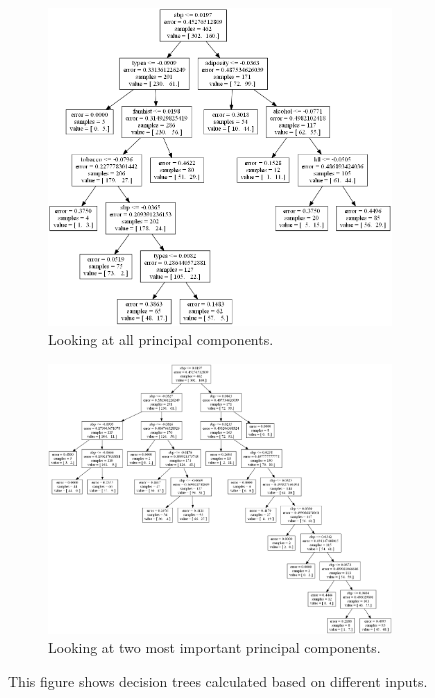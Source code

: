\begin{figure}
	\begin{subfigure}[b]{0.5\textwidth}
	\includegraphics[scale=0.2]{pictures/Decision_Tree_XPC.png}
	\caption{Looking at all principal components.}
	\label{decisionTreeXPA}
	\end{subfigure}
	\begin{subfigure}[b]{0.5\textwidth}
	\includegraphics[scale=0.2]{pictures/Decision_Tree_X2PC.png}
	\caption{Looking at two most important principal components.}
	\label{decisionTreeX2PA}
	\end{subfigure}
\caption{This figure shows decision trees calculated based on different inputs.}
\label{decisionTrees}
\end{figure}

